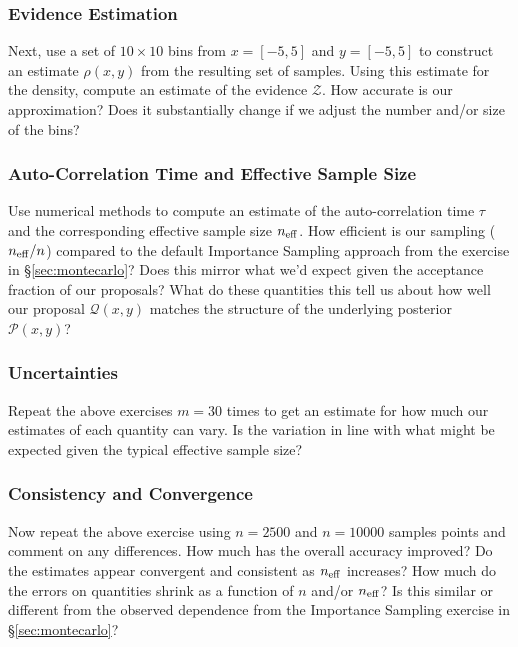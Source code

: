 \documentclass[12pt, titlepage]{article}
\newcommand{\posterior}{\ensuremath{\mathcal{P}}}
\newcommand{\proposal}{\ensuremath{\mathcal{Q}}}
\newcommand{\evidence}{\ensuremath{\mathcal{Z}}}
\begin{document}
\subsubsection*{Evidence Estimation}

Next, use a set of $10 \times 10$ bins from
$x=[-5, 5]$ and $y=[-5, 5]$ to construct an estimate $\rho(x,y)$ 
from the resulting set of samples. Using this estimate
for the density, compute an estimate of the evidence $\evidence$.
How accurate is our approximation? Does it substantially
change if we adjust the number and/or size of the bins?

\subsubsection*{Auto-Correlation Time and Effective Sample Size}

Use numerical methods to compute an estimate of the
auto-correlation time $\tau$ and the corresponding effective sample size $n_{\rm eff}$.
How efficient is our sampling ($n_{\rm eff}/n$) compared to the default
Importance Sampling approach from the exercise in \S\ref{sec:montecarlo}?
Does this mirror what we'd expect given the acceptance fraction of our proposals?
What do these quantities this tell us about how well 
our proposal $\proposal(x,y)$ matches the structure of the underlying posterior
$\posterior(x,y)$?

\subsubsection*{Uncertainties}

Repeat the above exercises $m=30$ times to get an
estimate for how much our estimates of each quantity can vary.
Is the variation in line with what might be expected given 
the typical effective sample size?

\subsubsection*{Consistency and Convergence}

Now repeat the above exercise using $n=2500$ and $n=10000$ samples
points and comment on any differences.
How much has the overall accuracy improved? Do
the estimates appear convergent and consistent as $n_{\rm eff}$ increases? 
How much do the errors on quantities shrink as a function 
of $n$ and/or $n_{\rm eff}$? Is this similar or different
from the observed dependence from the Importance Sampling exercise
in \S\ref{sec:montecarlo}?
\end{document}
